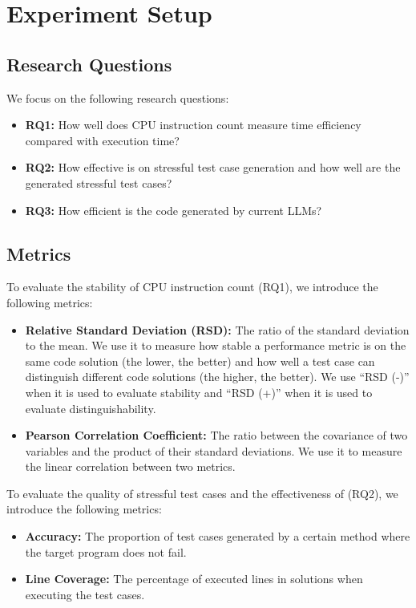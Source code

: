 \section{Experiment Setup}\label{sec:setup}

\subsection{Research Questions}
We focus on the following research questions:
\begin{itemize}
    \item \textbf{RQ1:} How well does CPU instruction count measure time efficiency compared with execution time?
    \item \textbf{RQ2:} How effective is \tool on stressful test case generation and how well are the generated stressful test cases?
    \item \textbf{RQ3:} How efficient is the code generated by current LLMs?
\end{itemize}

\subsection{Metrics}
To evaluate the stability of CPU instruction count (RQ1), we introduce the following metrics:
\begin{itemize}
    \item \textbf{Relative Standard Deviation (RSD):} The ratio of the standard deviation to the mean. We use it to measure how stable a performance metric is on the same code solution (the lower, the better) and how well a test case can distinguish different code solutions (the higher, the better). We use ``RSD (-)'' when it is used to evaluate stability and ``RSD (+)'' when it is used to evaluate distinguishability.
    \item \textbf{Pearson Correlation Coefficient:} The ratio between the covariance of two variables and the product of their standard deviations. We use it to measure the linear correlation between two metrics.
\end{itemize}


To evaluate the quality of stressful test cases and the effectiveness of \tool (RQ2), we introduce the following metrics:
\begin{itemize}
    \item \textbf{Accuracy:} The proportion of test cases generated by a certain method where the target program does not fail.
    \item \textbf{Line Coverage:} The percentage of executed lines in solutions when executing the test cases.
\end{itemize}


